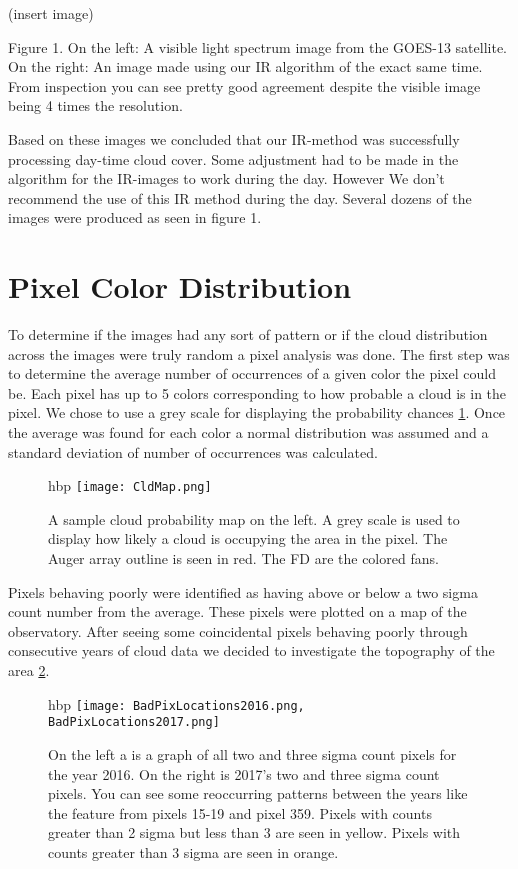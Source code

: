 \documentclass{article}
\begin{document}
(insert image) 

Figure 1. On the left: A visible light spectrum image from the GOES-13
satellite. On the right: An image made using our IR algorithm of the exact same
time. From inspection you can see pretty good agreement despite the visible
image being 4 times the resolution. 

Based on these images we concluded that our IR-method was successfully
processing day-time cloud cover. Some adjustment had to be made in the
algorithm for the IR-images to work during the day. However We don’t recommend
the use of this IR method during the day. Several dozens of the images were
produced as seen in figure 1. 

 \section{Pixel Color Distribution} 

 To determine if the images had any sort of pattern or if the cloud
distribution across the images were truly random a pixel analysis was done. The
first step was to determine the average number of occurrences of a given color
the pixel could be. Each pixel has up to 5 colors corresponding to how probable
a cloud is in the pixel. We chose to use a grey scale for displaying the
probability chances \ref{fig:CloudMap}. Once the average was found for each
color a normal distribution was assumed and a standard deviation of number of
occurrences was calculated. 

\begin{figure}{hbp} 
\texttt{[image: CldMap.png]}
 \caption{A sample cloud probability map on the left. A grey scale is used to
display how likely a cloud is occupying the area in the pixel. The Auger array
outline is seen in red. The FD are the colored fans.} 
 \label{fig:CloudMap}
\end{figure}

Pixels behaving poorly were identified as having above or below a two sigma
count number from the average. These pixels were plotted on a map of the
observatory. After seeing some coincidental pixels behaving poorly through
consecutive years of cloud data we decided to investigate the topography of the
area \ref{fig:2016_2017}. 

\begin{figure}{hbp} 
\texttt{[image: BadPixLocations2016.png, BadPixLocations2017.png]} 
  \caption{On the left a is a graph of all two and three sigma count pixels for the year
2016. On the right is 2017’s two and three sigma count pixels. You can see some
reoccurring patterns between the years like the feature from pixels 15-19 and
pixel 359.  Pixels with counts greater than 2 sigma but less than 3 are seen in
yellow. Pixels with counts greater than 3 sigma are seen in orange.}
 \label{fig:2016_2017} 
\end{figure}
\end{document}
